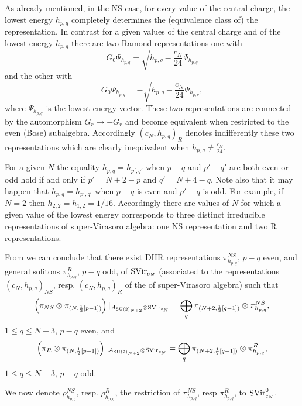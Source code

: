 \documentclass[11pt]{article}
\def\A{{\cal A}}
\def\su2{{{\rm SU}(2)}}
\def\A{{\mathcal A}}
\begin{document}
As already mentioned, in the NS case, for every value of the central charge, the lowest energy
$h_{p,q}$ completely determines the (equivalence class of) the 
representation. In contrast for a given values of the central charge 
and of the lowest energy $h_{p,q}$ there are two Ramond representations 
one with 
\[
G_0\Psi_{h_{p,q}}= \sqrt{h_{p,q} - \frac{c_N}{24}}\Psi_{h_{p,q}}
\]
and the other with
\[
G_0\Psi_{h_{p,q}}= -\sqrt{h_{p,q} - \frac{c_N}{24}}\Psi_{h_{p,q}},
\]
where $\Psi_{h_{p,q}}$ is the lowest energy vector. These two 
representations are connected by the automorphism 
$G_r \to - G_r$ and become equivalent when restricted to the even 
(Bose) subalgebra. Accordingly $(c_N,h_{p,q})_{R}$ denotes indifferently these 
two representations which are clearly inequivalent when 
$h_{p,q} \neq \frac{c_N}{24}$. 

For a given $N$ the equality $h_{p,q} = h_{p',q'}$ when 
$p-q$ and $p'-q'$ are both even or odd hold if and only 
if $p'=N+2-p$ and $q'= N+4 - q$. Note also that it may happen 
that $h_{p,q} = h_{p',q'}$ when $p-q$ is even and $p'-q$ 
is odd. For example, if $N=2$ then $h_{2,2} = h_{1,2}= 1/16$. 
Accordingly there are values of $N$ for which a given value 
of the lowest energy corresponds to three distinct irreducible 
representations of super-Virasoro algebra: one NS representation and two
R representations.  

From \cite[Section 4]{GKO} we can conclude that there exist DHR representations 
$\pi_{h_{p,q}}^{NS}$, $p-q$ even, and general solitons 
$\pi_{h_{p,q}}^{R}$, $p-q$ odd, of ${\rm SVir}_{c_N}$ (associated to the representations 
$(c_N,h_{p,q})_{NS}$, resp. $(c_N,h_{p,q})_{R}$ of the of super-Virasoro algebra)
such that  
%
\begin{equation}
\label{GKOnetsNS}
\left( \pi_{NS} \otimes \pi_{(N,\frac{1}{2}[p-1])}\right)
|_{\A_{\su2_{N+2}}\otimes {\rm SVir}_{c_N}} =
\bigoplus_q \pi_{(N+2, \frac{1}{2}[q-1])} \otimes \pi_{h_{p,q}}^{NS},
\end{equation}
$1\leq q \leq N+3$, $p-q$ even, and
%
\begin{equation}
\label{GKOnetsR}
\left( \pi_{R} \otimes \pi_{(N,\frac{1}{2}[p-1])}\right)
|_{\A_{\su2_{N+2}}\otimes {\rm SVir}_{c_N}} =
\bigoplus_q \pi_{(N+2, \frac{1}{2}[q-1])} \otimes \pi_{h_{p,q}}^{R},
\end{equation}
$1\leq q \leq N+3$, $p-q$ odd. 
                                                                                
We now denote $\rho_{h_{p,q}}^{NS}$,  resp. $\rho_{h_{p,q}}^{R}$, 
the restriction of $\pi_{h_{p,q}}^{NS}$, resp 
$\pi_{h_{p,q}}^{R}$, to ${\rm SVir}^0_{c_N}$. 
\end{document}
